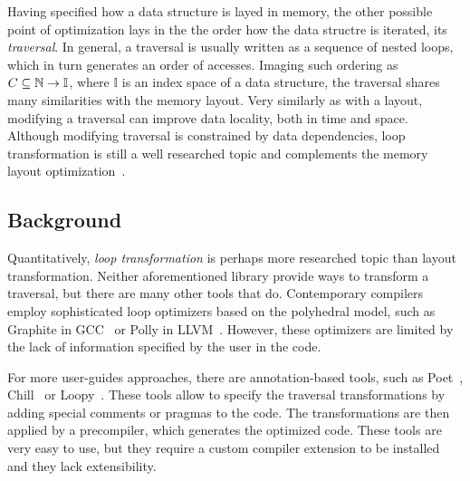 Having specified how a data structure is layed in memory, the other possible point of optimization lays in the the order how the data structre is iterated, its \emph{traversal}. In general, a traversal is usually written as a sequence of nested loops, which in turn generates an order of accesses. Imaging such ordering as $ C\subseteq \mathbb{N} \to \mathbb{I}$, where $\mathbb{I}$ is an index space of a data structure, the traversal shares many similarities with the memory layout. Very similarly as with a layout, modifying a traversal can improve data locality, both in time and space. Although modifying traversal is constrained by data dependencies, loop transformation is still a well researched topic and complements the memory layout optimization~\cite{clauss2000automatic}.

\subsection{Background}

Quantitatively, \emph{loop transformation} is perhaps more researched topic than layout transformation. Neither aforementioned library provide ways to transform a traversal, but there are many other tools that do. Contemporary compilers employ sophisticated loop optimizers based on the polyhedral model, such as Graphite in GCC~\cite{trifunovic2010graphite} or Polly in LLVM~\cite{grosser2012polly}. However, these optimizers are limited by the lack of information specified by the user in the code.

For more user-guides approaches, there are annotation-based tools, such as Poet~\cite{yi2007poet}, Chill~\cite{chen2008chill} or Loopy~\cite{namjoshi2016loopy}. These tools allow to specify the traversal transformations by adding special comments or pragmas to the code. The transformations are then applied by a precompiler, which generates the optimized code. These tools are very easy to use, but they require a custom compiler extension to be installed and they lack extensibility.

